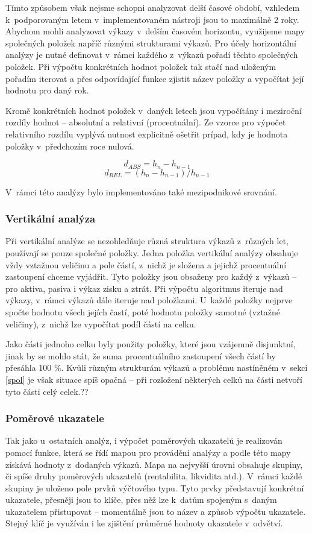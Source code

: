 Tímto způsobem však nejsme schopni analyzovat delší časové období, vzhledem k~podporovaným letem v~implementovaném nástroji jsou to maximálně 2 roky. Abychom mohli analyzovat výkazy v~delším časovém horizontu, využijeme mapy společných položek napříč různými strukturami výkazů. Pro účely horizontální analýzy je nutné definovat v~rámci každého z~výkazů pořadí těchto společných položek. Při výpočtu konkrétních hodnot položek tak stačí nad uloženým pořadím iterovat a přes odpovídající funkce zjistit název položky a vypočítat její hodnotu pro daný rok.

Kromě konkrétních hodnot položek v~daných letech jsou vypočítány i meziroční rozdíly hodnot -- absolutní a relativní (procentuální). Ze vzorce pro výpočet relativního rozdílu vyplývá nutnost explicitně ošetřit prípad, kdy je hodnota položky v~předchozím roce nulová.

$$d_{ABS}=h_{n}-h_{n-1}$$
$$d_{REL}=(h_{n}-h_{n-1})/h_{n-1}$$

V~rámci této analýzy bylo implementováno také mezipodnikové srovnání.


\subsubsection{Vertikální analýza}
Při vertikální analýze se nezohledňuje různá struktura výkazů z~různých let, používají se pouze společné položky. Jedna položka vertikální analýzy obsahuje vždy vztažnou veličinu a pole částí, z~nichž je složena a jejichž procentuální zastoupení chceme vyjádřit. Tyto položky jsou obsaženy pro každý z~výkazů -- pro aktiva, pasiva i výkaz zisku a ztrát. Při výpočtu algoritmus iteruje nad výkazy, v~rámci výkazů dále iteruje nad položkami. U~každé položky nejprve spočte hodnotu všech jejích častí, poté hodnotu položky samotné (vztažné veličiny), z~nichž lze vypočítat podíl částí na celku.

Jako části jednoho celku byly použity položky, které jsou vzájemně disjunktní, jinak by se mohlo stát, že suma procentuálního zastoupení všech částí by přesáhla 100 \%. Kvůli různým strukturám výkazů a problému nastíněném v~sekci \ref{spol} je však situace spíš opačná -- při rozložení některých celků na části netvoří tyto části celý celek.??

\subsubsection{Poměrové ukazatele}
Tak jako u~ostatních analýz, i výpočet poměrových ukazatelů je realizován pomocí funkce, která se řídí mapou pro provádění analýzy a podle této mapy získává hodnoty z~dodaných výkazů. Mapa na nejvyšší úrovni obsahuje skupiny, či spíše druhy poměrových ukazatelů (rentabilita, likvidita atd.). V~rámci každé skupiny je uloženo pole prvků výčtového typu. Tyto prvky představují konkrétní ukazatele, přesněji jsou to klíče, přes něž lze k~datům spojeným s~daným ukazatelem přistupovat -- momentálně jsou to název a způsob výpočtu ukazatele. Stejný klíč je využíván i ke zjištění průměrné hodnoty ukazatele v~odvětví.


